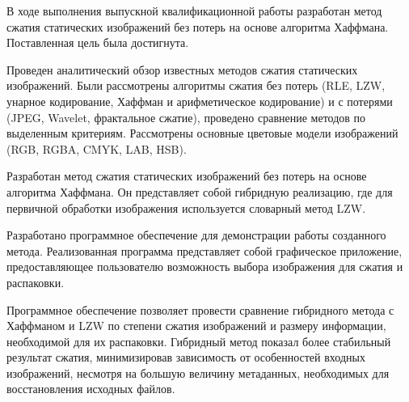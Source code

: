 \conclusion

В ходе выполнения выпускной квалификационной работы разработан метод сжатия статических изображений без потерь на основе алгоритма Хаффмана. Поставленная цель была достигнута.

Проведен аналитический обзор известных методов сжатия статических изображений. Были рассмотрены алгоритмы сжатия без потерь (RLE, LZW, унарное кодирование, Хаффман и арифметическое кодирование) и с потерями (JPEG, Wavelet, фрактальное сжатие), проведено сравнение методов по выделенным критериям. Рассмотрены основные цветовые модели изображений (RGB, RGBA, CMYK, LAB, HSB).

Разработан метод сжатия статических изображений без потерь на основе алгоритма Хаффмана. Он представляет собой гибридную реализацию, где для первичной обработки изображения используется словарный метод LZW.

Разработано программное обеспечение для демонстрации работы созданного метода. Реализованная программа представляет собой графическое приложение, предоставляющее пользователю возможность выбора изображения для сжатия и распаковки. 

Программное обеспечение позволяет провести сравнение гибридного метода с Хаффманом и LZW по степени сжатия изображений и размеру информации, необходимой для их распаковки. Гибридный метод показал более стабильный результат сжатия, минимизировав зависимость от особенностей входных изображений, несмотря на большую величину метаданных, необходимых для восстановления исходных файлов.
